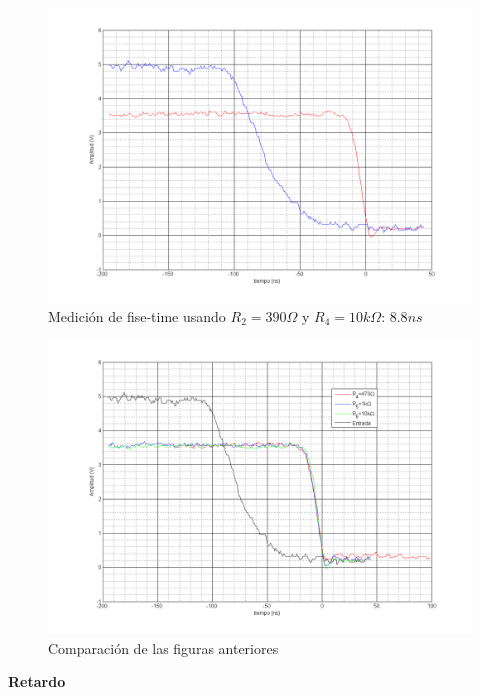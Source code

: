 \documentclass[12pt,a4paper]{article}
\begin{document}
\begin{figure}[H]
\centering
\includegraphics[width=\textwidth]{img/FT3.png}
\caption{Medición de fise-time usando $R_2=390\Omega$ y $R_4=10k\Omega$: $8.8ns$}
\end{figure}

\begin{figure}[H]
\centering
\includegraphics[width=\textwidth]{img/compFT.png}
\caption{Comparación de las figuras anteriores}
\end{figure}

\textbf{Retardo}
\end{document}
